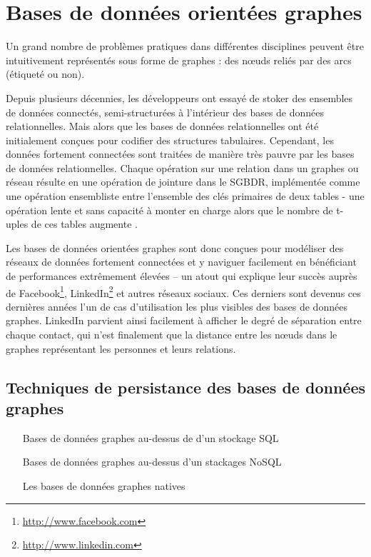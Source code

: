 \section{Bases de données orientées graphes}
\label{sec:graph-database-overview}
\begin{text}
  Un grand nombre de problèmes pratiques dans différentes disciplines
  peuvent être intuitivement représentés sous forme de graphes : des
  nœuds reliés par des arcs (étiqueté ou non).

  Depuis plusieurs décennies, les développeurs ont essayé de stoker
  des ensembles de données connectés, semi-structurées à l'intérieur
  des bases de données relationnelles. Mais alors que les bases de
  données relationnelles ont été initialement conçues pour codifier
  des structures tabulaires. Cependant, les données fortement
  connectées sont traitées de manière très pauvre par les bases de
  données relationnelles. Chaque opération sur une relation dans un
  graphes ou réseau résulte en une opération de jointure dans le
  \acrshort{SGBDR}, implémentée comme une opération ensembliste entre
  l'ensemble des clés primaires de deux tables - une opération lente
  et sans capacité à monter en charge alors que le nombre de t-uples
  de ces tables augmente \cite{robinson2013graph}.

  Les bases de données orientées graphes sont donc conçues pour
  modéliser des réseaux de données fortement connectées et y naviguer
  facilement en bénéficiant de performances extrêmement élevées – un
  atout qui explique leur succès auprès de
  Facebook\footnote{\url{http://www.facebook.com}},
  LinkedIn\footnote{\url{http://www.linkedin.com}} et autres réseaux
  sociaux. Ces derniers sont devenus ces dernières années l'un de cas
  d'utilisation les plus visibles des bases de données graphes.
  LinkedIn parvient ainsi facilement à afficher le degré de séparation
  entre chaque contact, qui n'est finalement que la distance entre les
  nœuds dans le graphes représentant les personnes et leurs relations.
\end{text}

  \subsection{Techniques de persistance des bases de données graphes}
  \label{sec:persistence-tech}

  \begin{itemize}
  \item [Bases de données graphes au-dessus de d'un stockage SQL]
  \item [Bases de données graphes au-dessus d'un stackages NoSQL]
  \item [Les bases de données graphes natives]
  \end{itemize}

